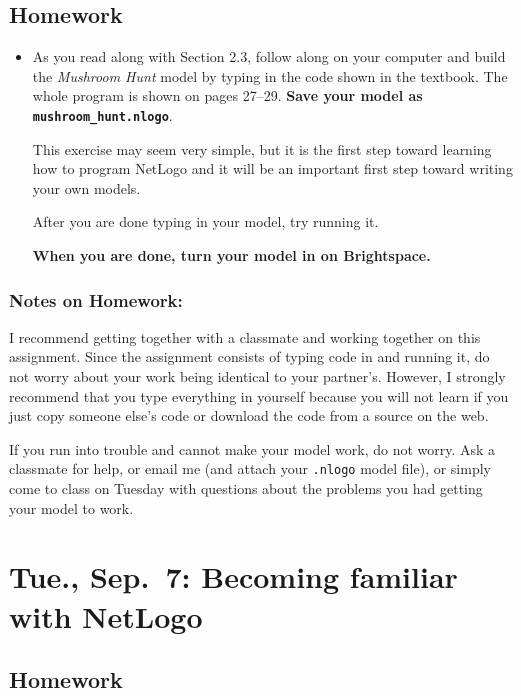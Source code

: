 \documentclass[
]{article}
\begin{document}
\hypertarget{homework-1}{%
\subsection{Homework}\label{homework-1}}

\begin{itemize}
\item
  As you read along with Section 2.3, follow along on your computer and
  build the \emph{Mushroom Hunt} model by typing in the code shown in
  the textbook. The whole program is shown on pages 27--29. \textbf{Save
  your model as \texttt{mushroom\_hunt.nlogo}}.

  This exercise may seem very simple, but it is the first step toward
  learning how to program NetLogo and it will be an important first step
  toward writing your own models.

  After you are done typing in your model, try running it.

  \textbf{When you are done, turn your model in on Brightspace.}
\end{itemize}

\hypertarget{notes-on-homework}{%
\subsubsection{Notes on Homework:}\label{notes-on-homework}}

I recommend getting together with a classmate and working together on
this assignment. Since the assignment consists of typing code in and
running it, do not worry about your work being identical to your
partner's. However, I strongly recommend that you type everything in
yourself because you will not learn if you just copy someone else's code
or download the code from a source on the web.

If you run into trouble and cannot make your model work, do not worry.
Ask a classmate for help, or email me (and attach your \texttt{.nlogo}
model file), or simply come to class on Tuesday with questions about the
problems you had getting your model to work.

\hypertarget{tue.-sep.-7-becoming-familiar-with-netlogo}{%
\section{Tue., Sep.~7: Becoming familiar with
NetLogo}\label{tue.-sep.-7-becoming-familiar-with-netlogo}}

\hypertarget{homework-2}{%
\subsection{Homework}\label{homework-2}}
\end{document}
